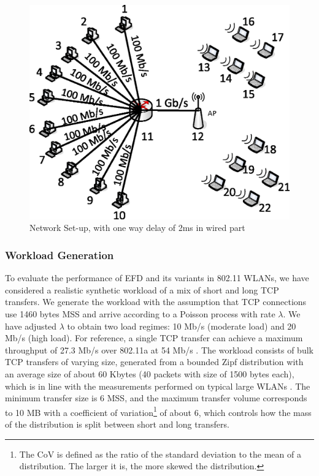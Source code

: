 \documentclass[preprint,12pt]{elsarticle}
\begin{document}
\begin{figure}[!ht]
   \centering
    \includegraphics[width=0.5 \textwidth]{./fig/wireless/setup/wlan_topology_bandwidth.eps}
  \caption{Network Set-up, with one way delay of 2ms in wired part}
  \label{fig:setup}  
\end{figure}

\subsubsection{Workload Generation}

To evaluate the performance of EFD and its variants in 802.11 WLANs, we have considered a realistic synthetic workload of a mix of short and long TCP transfers. We generate the workload with the assumption that TCP connections use 1460 bytes MSS and arrive according to a Poisson process with rate $\lambda$. We have adjusted $\lambda$ to obtain two load regimes: 10 Mb/s (moderate load) and 20 Mb/s (high load). For reference, a single TCP transfer can achieve a maximum throughput of 27.3 Mb/s over 802.11a at 54 Mb/s \cite{Matthew2003}. The workload consists of bulk TCP transfers of varying size, generated from a bounded Zipf distribution with an average size of about 60 Kbytes (40 packets with size of 1500 bytes each), which is in line with the measurements performed on typical large WLANs \cite{MengWYL04}. The minimum transfer size is 6 MSS, and the maximum transfer volume corresponds to 10 MB with a coefficient of variation\footnote{The CoV is defined as the ratio of the standard deviation to the mean of a distribution. The larger it is, the more skewed the distribution. } of about 6, which controls how the mass of the distribution is split between short and long transfers. %
\end{document}
